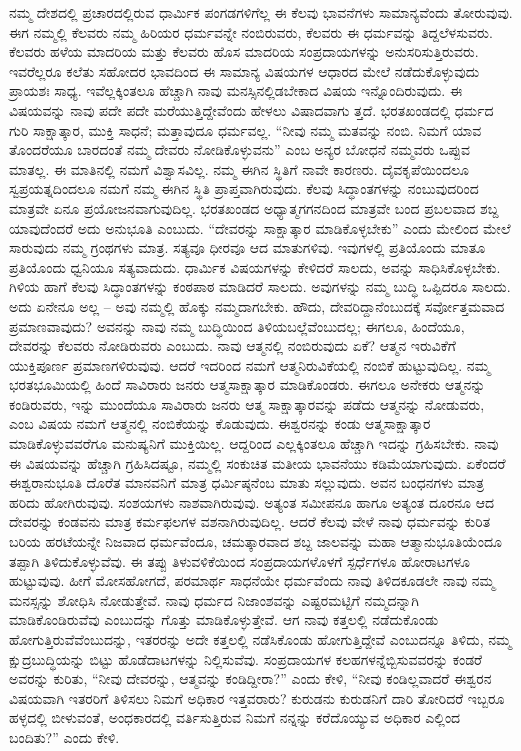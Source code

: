 ನಮ್ಮ ದೇಶದಲ್ಲಿ ಪ್ರಚಾರದಲ್ಲಿರುವ ಧಾರ್ಮಿಕ ಪಂಗಡಗಳಿಗೆಲ್ಲ ಈ ಕೆಲವು ಭಾವನೆಗಳು ಸಾಮಾನ್ಯವೆಂದು ತೋರುವುವು. ಈಗ ನಮ್ಮಲ್ಲಿ ಕೆಲವರು ನಮ್ಮ ಹಿರಿಯರ ಧರ್ಮವನ್ನೇ ನಂಬಿರುವರು, ಕೆಲವರು ಈ ಧರ್ಮವನ್ನು ತಿದ್ದಲೆಳಸುವರು. ಕೆಲವರು ಹಳೆಯ ಮಾದರಿಯ ಮತ್ತು ಕೆಲವರು ಹೊಸ ಮಾದರಿಯ ಸಂಪ್ರದಾಯಗಳನ್ನು ಅನುಸರಿಸುತ್ತಿರುವರು. ಇವರೆಲ್ಲರೂ ಕಲೆತು ಸಹೋದರ ಭಾವದಿಂದ ಈ ಸಾಮಾನ್ಯ ವಿಷಯಗಳ ಆಧಾರದ ಮೇಲೆ ನಡೆದುಕೊಳ್ಳುವುದು ಪ್ರಾಯಶಃ ಸಾಧ್ಯ. ಇವೆಲ್ಲಕ್ಕಿಂತಲೂ ಹೆಚ್ಚಾಗಿ ನಾವು ಮನಸ್ಸಿನಲ್ಲಿಡಬೇಕಾದ ವಿಷಯ ಇನ್ನೊಂದಿರುವುದು. ಈ ವಿಷಯವನ್ನು ನಾವು ಪದೇ ಪದೇ ಮರೆಯುತ್ತಿದ್ದೇವೆಂದು ಹೇಳಲು ವಿಷಾದವಾಗು ತ್ತದೆ. ಭರತಖಂಡದಲ್ಲಿ ಧರ್ಮದ ಗುರಿ ಸಾಕ್ಷಾತ್ಕಾರ, ಮುಕ್ತಿ ಸಾಧನೆ; ಮತ್ತಾವುದೂ ಧರ್ಮವಲ್ಲ. “ನೀವು ನಮ್ಮ ಮತವನ್ನು ನಂಬಿ. ನಿಮಗೆ ಯಾವ ತೊಂದರೆಯೂ ಬಾರದಂತೆ ನಮ್ಮ ದೇವರು ನೋಡಿಕೊಳ್ಳುವನು” ಎಂಬ ಅನ್ಯರ ಬೋಧನೆ ನಮ್ಮವರು ಒಪ್ಪುವ ಮಾತಲ್ಲ. ಈ ಮಾತಿನಲ್ಲಿ ನಮಗೆ ವಿಶ್ವಾಸವಿಲ್ಲ. ನಮ್ಮ ಈಗಿನ ಸ್ಥಿತಿಗೆ ನಾವೇ ಕಾರಣರು. ದೈವಕೃಪೆಯಿಂದಲೂ ಸ್ವಪ್ರಯತ್ನದಿಂದಲೂ ನಮಗೆ ನಮ್ಮ ಈಗಿನ ಸ್ಥಿತಿ ಪ್ರಾಪ್ತವಾಗಿರುವುದು. ಕೆಲವು ಸಿದ್ಧಾಂತಗಳನ್ನು ನಂಬುವುದರಿಂದ ಮಾತ್ರವೇ ಏನೂ ಪ್ರಯೋಜನವಾಗುವುದಿಲ್ಲ. ಭರತಖಂಡದ ಅಧ್ಯಾತ್ಮಗಗನದಿಂದ ಮಾತ್ರವೇ ಬಂದ ಪ್ರಬಲವಾದ ಶಬ್ದ ಯಾವುದೆಂದರೆ ಅದು ಅನುಭೂತಿ ಎಂಬುದು. “ದೇವರನ್ನು ಸಾಕ್ಷಾತ್ಕಾರ ಮಾಡಿಕೊಳ್ಳಬೇಕು” ಎಂದು ಮೇಲಿಂದ ಮೇಲೆ ಸಾರುವುದು ನಮ್ಮ ಗ್ರಂಥಗಳು ಮಾತ್ರ. ಸತ್ಯವೂ ಧೀರವೂ ಆದ ಮಾತುಗಳಿವು. ಇವುಗಳಲ್ಲಿ ಪ್ರತಿಯೊಂದು ಮಾತೂ ಪ್ರತಿಯೊಂದು ಧ್ವನಿಯೂ ಸತ್ಯವಾದುದು. ಧಾರ್ಮಿಕ ವಿಷಯಗಳನ್ನು ಕೇಳಿದರೆ ಸಾಲದು, ಅವನ್ನು ಸಾಧಿಸಿಕೊಳ್ಳಬೇಕು. ಗಿಳಿಯ ಹಾಗೆ ಕೆಲವು ಸಿದ್ಧಾಂತಗಳನ್ನು ಕಂಠಪಾಠ ಮಾಡಿದರೆ ಸಾಲದು. ಅವುಗಳನ್ನು ನಮ್ಮ ಬುದ್ಧಿ ಒಪ್ಪಿದರೂ ಸಾಲದು. ಅದು ಏನೇನೂ ಅಲ್ಲ – ಅವು ನಮ್ಮಲ್ಲಿ ಹೊಕ್ಕು ನಮ್ಮದಾಗಬೇಕು. ಹೌದು, ದೇವರಿದ್ದಾನೆಂಬುದಕ್ಕೆ ಸರ್ವೋತ್ತಮವಾದ ಪ್ರಮಾಣವಾವುದು? ಅವನನ್ನು ನಾವು ನಮ್ಮ ಬುದ್ಧಿಯಿಂದ ತಿಳಿಯಬಲ್ಲೆವೆಂಬುದಲ್ಲ; ಈಗಲೂ, ಹಿಂದೆಯೂ, ದೇವರನ್ನು ಕೆಲವರು ನೋಡಿರುವರು ಎಂಬುದು. ನಾವು ಆತ್ಮನಲ್ಲಿ ನಂಬಿರುವುದು ಏಕೆ? ಆತ್ಮನ ಇರುವಿಕೆಗೆ ಯುಕ್ತಿಪೂರ್ಣ ಪ್ರಮಾಣಗಳಿರುವುವು. ಆದರೆ ಇದರಿಂದ ನಮಗೆ ಆತ್ಮನಿರುವಿಕೆಯಲ್ಲಿ ನಂಬಿಕೆ ಹುಟ್ಟುವುದಿಲ್ಲ. ನಮ್ಮ ಭರತಭೂಮಿಯಲ್ಲಿ ಹಿಂದೆ ಸಾವಿರಾರು ಜನರು ಆತ್ಮಸಾಕ್ಷಾತ್ಕಾರ ಮಾಡಿಕೊಂಡರು. ಈಗಲೂ ಅನೇಕರು ಆತ್ಮನನ್ನು ಕಂಡಿರುವರು, ಇನ್ನು ಮುಂದೆಯೂ ಸಾವಿರಾರು ಜನರು ಆತ್ಮ ಸಾಕ್ಷಾತ್ಕಾರವನ್ನು ಪಡೆದು ಆತ್ಮನನ್ನು ನೋಡುವರು, ಎಂಬ ವಿಷಯ ನಮಗೆ ಆತ್ಮನಲ್ಲಿ ನಂಬಿಕೆಯನ್ನು ಕೊಡುವುದು. ಈಶ್ವರನನ್ನು ಕಂಡು ಆತ್ಮಸಾಕ್ಷಾತ್ಕಾರ ಮಾಡಿಕೊಳ್ಳುವವರೆಗೂ ಮನುಷ್ಯನಿಗೆ ಮುಕ್ತಿಯಿಲ್ಲ. ಆದ್ದರಿಂದ ಎಲ್ಲಕ್ಕಿಂತಲೂ ಹೆಚ್ಚಾಗಿ ಇದನ್ನು ಗ್ರಹಿಸಬೇಕು. ನಾವು ಈ ವಿಷಯವನ್ನು ಹೆಚ್ಚಾಗಿ ಗ್ರಹಿಸಿದಷ್ಟೂ, ನಮ್ಮಲ್ಲಿ ಸಂಕುಚಿತ ಮತೀಯ ಭಾವನೆಯು ಕಡಿಮೆಯಾಗುವುದು. ಏಕೆಂದರೆ ಈಶ್ವರಾನುಭೂತಿ ದೊರೆತ ಮಾನವನಿಗೆ ಮಾತ್ರ ಧರ್ಮಿಷ್ಠನೆಂಬ ಮಾತು ಸಲ್ಲುವುದು. ಅವನ ಬಂಧನಗಳು ಮಾತ್ರ ಹರಿದು ಹೋಗಿರುವುವು. ಸಂಶಯಗಳು ನಾಶವಾಗಿರುವುವು. ಅತ್ಯಂತ ಸಮೀಪನೂ ಹಾಗೂ ಅತ್ಯಂತ ದೂರನೂ ಆದ ದೇವರನ್ನು ಕಂಡವನು ಮಾತ್ರ ಕರ್ಮಫಲಗಳ ವಶನಾಗಿರುವುದಿಲ್ಲ. ಆದರೆ ಕೆಲವು ವೇಳೆ ನಾವು ಧರ್ಮವನ್ನು ಕುರಿತ ಬರಿಯ ಹರಟೆಯನ್ನೇ ನಿಜವಾದ ಧರ್ಮವೆಂದೂ, ಚಮತ್ಕಾರವಾದ ಶಬ್ದ ಜಾಲವನ್ನು ಮಹಾ ಆತ್ಮಾನುಭೂತಿಯೆಂದೂ ತಪ್ಪಾಗಿ ತಿಳಿದುಕೊಳ್ಳುವೆವು. ಈ ತಪ್ಪು ತಿಳುವಳಿಕೆಯಿಂದ ಸಂಪ್ರದಾಯಗಳೊಳಗೆ ಸ್ಪರ್ಧೆಗಳೂ ಹೋರಾಟಗಳೂ ಹುಟ್ಟುವುವು. ಹೀಗೆ ಮೋಸಹೋಗದೆ, ಪರಮಾರ್ಥ ಸಾಧನೆಯೇ ಧರ್ಮವೆಂದು ನಾವು ತಿಳಿದಕೂಡಲೇ ನಾವು ನಮ್ಮ ಮನಸ್ಸನ್ನು ಶೋಧಿಸಿ ನೋಡುತ್ತೇವೆ. ನಾವು ಧರ್ಮದ ನಿಜಾಂಶವನ್ನು ಎಷ್ಟರಮಟ್ಟಿಗೆ ನಮ್ಮದನ್ನಾಗಿ ಮಾಡಿಕೊಂಡಿರುವೆವು ಎಂಬುದನ್ನು ಗೊತ್ತು ಮಾಡಿಕೊಳ್ಳುತ್ತೇವೆ. ಆಗ ನಾವು ಕತ್ತಲಲ್ಲಿ ನಡೆದುಕೊಂಡು ಹೋಗುತ್ತಿರುವೆವೆಂಬುದನ್ನು, ಇತರರನ್ನು ಅದೇ ಕತ್ತಲಲ್ಲಿ ನಡೆಸಿಕೊಂಡು ಹೋಗುತ್ತಿದ್ದೇವೆ ಎಂಬುದನ್ನೂ ತಿಳಿದು, ನಮ್ಮ ಕ್ಷುದ್ರಬುದ್ಧಿಯನ್ನು ಬಿಟ್ಟು ಹೊಡೆದಾಟಗಳನ್ನು ನಿಲ್ಲಿಸುವೆವು. ಸಂಪ್ರದಾಯಗಳ ಕಲಹಗಳನ್ನೆಬ್ಬಿಸುವವರನ್ನು ಕಂಡರೆ ಅವರನ್ನು ಕುರಿತು, “ನೀವು ದೇವರನ್ನು, ಆತ್ಮವನ್ನು ಕಂಡಿದ್ದೀರಾ?” ಎಂದು ಕೇಳಿ, “ನೀವು ಕಂಡಿಲ್ಲವಾದರೆ ಈಶ್ವರನ ವಿಷಯವಾಗಿ ಇತರರಿಗೆ ತಿಳಿಸಲು ನಿಮಗೆ ಅಧಿಕಾರ ಇತ್ತವರಾರು? ಕುರುಡನು ಕುರುಡನಿಗೆ ದಾರಿ ತೋರಿದರೆ ಇಬ್ಬರೂ ಹಳ್ಳದಲ್ಲಿ ಬೀಳುವಂತೆ, ಅಂಧಕಾರದಲ್ಲಿ ವರ್ತಿಸುತ್ತಿರುವ ನಿಮಗೆ ನನ್ನನ್ನು ಕರೆದೊಯ್ಯುವ ಅಧಿಕಾರ ಎಲ್ಲಿಂದ ಬಂದಿತು?” ಎಂದು ಕೇಳಿ.

